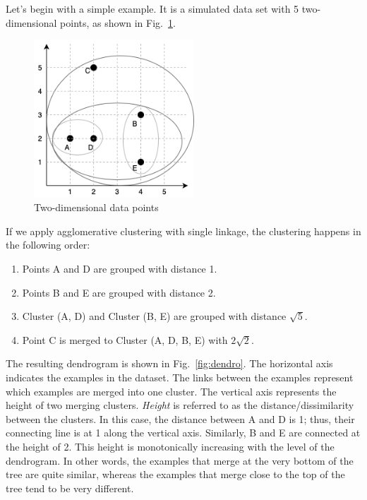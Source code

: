 Let's begin with a simple example. It is a simulated data set with 5 two-dimensional points, as shown in Fig.~\ref{fig:data}. 

\begin{figure}[htp]
\centering
\captionsetup{justification=centering}
\includegraphics[width=6cm]{"Part 3 - Learning Systems/Unsupervised Learning/Hierarchical Clustering/figures/Dendrogram-Data.png"}
\caption{Two-dimensional data points}
\label{fig:data}
\end{figure}

If we apply agglomerative clustering with single linkage, the clustering happens in the following order:
\begin{enumerate}
\item Points A and D are grouped with distance 1. 
\item Points B and E are grouped with distance 2. 
\item Cluster (A, D) and Cluster (B, E) are grouped with distance $\sqrt{5}$. 
\item Point C is merged to Cluster (A, D, B, E) with $2\sqrt{2}$. 
\end{enumerate}

The resulting dendrogram is shown in Fig.~\ref{fig:dendro}. The horizontal axis indicates the examples in the dataset. The links between the examples represent which examples are merged into one cluster. The vertical axis represents the height of two merging clusters. \textit{Height} is referred to as the distance/dissimilarity between the clusters. In this case, the distance between A and D is 1; thus, their connecting line is at 1 along the vertical axis. Similarly, B and E are connected at the height of 2. This height is monotonically increasing with the level of the dendrogram. In other words, the examples that merge at the very bottom of the tree are quite similar, whereas the examples that merge close to the top of the tree tend to be very different. 

